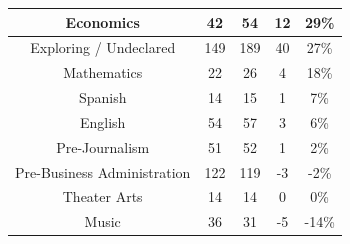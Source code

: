 \documentclass[10]{article}
\begin{document}
\begin{longtable}[c]{|ccccc|}
	\multicolumn{1}{|c|}{Economics}                                  & \multicolumn{1}{c|}{42}                              & \multicolumn{1}{c|}{54}                                  & \multicolumn{1}{c|}{12}                 & 29\%                  \\ \hline
	\multicolumn{1}{|c|}{Exploring / Undeclared}                     & \multicolumn{1}{c|}{149}                             & \multicolumn{1}{c|}{189}                                 & \multicolumn{1}{c|}{40}                 & 27\%                  \\ \hline
	\multicolumn{1}{|c|}{Mathematics}                                & \multicolumn{1}{c|}{22}                              & \multicolumn{1}{c|}{26}                                  & \multicolumn{1}{c|}{4}                  & 18\%                  \\ \hline
	\multicolumn{1}{|c|}{Spanish}                                    & \multicolumn{1}{c|}{14}                              & \multicolumn{1}{c|}{15}                                  & \multicolumn{1}{c|}{1}                  & 7\%                   \\ \hline
	\multicolumn{1}{|c|}{English}                                    & \multicolumn{1}{c|}{54}                              & \multicolumn{1}{c|}{57}                                  & \multicolumn{1}{c|}{3}                  & 6\%                   \\ \hline
	\multicolumn{1}{|c|}{Pre-Journalism}                             & \multicolumn{1}{c|}{51}                              & \multicolumn{1}{c|}{52}                                  & \multicolumn{1}{c|}{1}                  & 2\%                   \\ \hline
	\multicolumn{1}{|c|}{Pre-Business Administration}                & \multicolumn{1}{c|}{122}                             & \multicolumn{1}{c|}{119}                                 & \multicolumn{1}{c|}{-3}                 & -2\%                  \\ \hline
	\multicolumn{1}{|c|}{Theater Arts}                               & \multicolumn{1}{c|}{14}                              & \multicolumn{1}{c|}{14}                                  & \multicolumn{1}{c|}{0}                  & 0\%                   \\ \hline
	\multicolumn{1}{|c|}{Music}                                      & \multicolumn{1}{c|}{36}                              & \multicolumn{1}{c|}{31}                                  & \multicolumn{1}{c|}{-5}                 & -14\%                 \\ \hline

\end{longtable}
\end{document}
